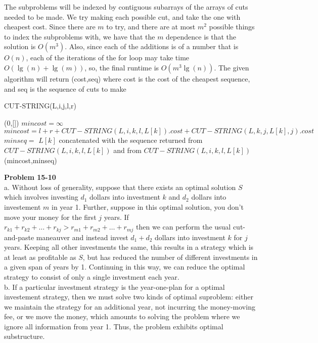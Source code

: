 \documentclass{article}
\begin{document}
The subproblems will be indexed by contiguous subarrays of the arrays of cuts needed to be made. We try making each possible cut, and take the one with cheapest cost. Since there are $m$ to try, and there are at most $m^2$ possible things to index the subproblems with, we have that the $m$ dependence is that the solution is $O(m^3)$. Also, since each of the additions is of a number that is $O(n)$, each of the iterations of the for loop may take time $O(\lg(n)+\lg(m))$, so, the final runtime is $O(m^3\lg(n))$. The given algorithm will return (cost,seq) where cost is the cost of the cheapest sequence, and seq is the sequence of cuts to make
\begin{algorithm}
\caption{CUT-STRING(L,i,j,l,r)}
\begin{algorithmic}
\State \Return (0,[])
\EndIf
\State $mincost =\infty$
\State $mincost = l+r + CUT-STRING(L,i,k,l,L[k]).cost + CUT-STRING(L,k,j,L[k],j).cost$
\State $minseq =$ $L[k]$ concatenated with the sequence returned from$ CUT-STRING(L,i,k,l,L[k])$ and from $CUT-STRING(L,i,k,l,L[k])$
\EndIf
\EndFor
\State \Return (mincost,minseq)
\end{algorithmic}
\end{algorithm}

\noindent\textbf{Problem 15-10}\\

a. Without loss of generality, suppose that there exists an optimal solution $S$ which involves investing $d_1$ dollars into investment $k$ and $d_2$ dollars into investement $m$ in year 1.  Further, suppose in this optimal solution, you don't move your money for the first $j$ years.   If $r_{k1} + r_{k2} + \ldots + r_{kj} > r_{m1} + r_{m2} + \ldots + r_{mj}$ then we can perform the usual cut-and-paste maneauver and instead invest $d_1 + d_2$ dollars into investment $k$ for $j$ years.  Keeping all other investments the same, this results in a strategy which is at least as profitable as $S$, but has reduced the number of different investments in a given span of years by 1.  Continuing in this way, we can reduce the optimal strategy to consist of only a single investment each year.  \\

b. If a particular investment strategy is the year-one-plan for a optimal investement strategy, then we must solve two kinds of optimal suproblem: either we maintain the strategy for an additional year, not incurring the money-moving fee, or we move the money, which amounts to solving the problem where we ignore all information from year 1. Thus, the problem exhibits optimal substructure. \\
\end{document}
